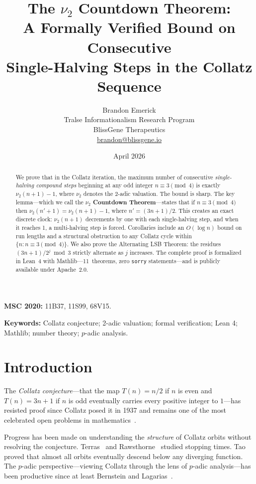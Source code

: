 \documentclass[12pt]{article}
\title{The $\nu_2$ Countdown Theorem:\\
A Formally Verified Bound on Consecutive\\
Single-Halving Steps in the Collatz Sequence}
\author{Brandon Emerick\\
\small Tralse Informationalism Research Program\\
\small BlissGene Therapeutics\\
\small \href{mailto:brandon@blissgene.io}{brandon@blissgene.io}}
\date{April 2026}
\newcommand{\vp}{\nu_2}
\begin{document}
\maketitle

\begin{abstract}
We prove that in the Collatz iteration, the maximum number of consecutive
\emph{single-halving compound steps} beginning at any odd integer
$n \equiv 3 \pmod{4}$ is exactly $\nu_2(n+1) - 1$, where $\nu_2$ denotes
the 2-adic valuation.  The bound is sharp.  The key lemma---which we call
the \textbf{$\nu_2$ Countdown Theorem}---states that if $n \equiv 3
\pmod{4}$ then $\nu_2(n'+1) = \nu_2(n+1) - 1$, where $n' = (3n+1)/2$.
This creates an exact discrete clock: $\vp(n+1)$ decrements by one with
each single-halving step, and when it reaches 1, a multi-halving step is
forced.  Corollaries include an $O(\log n)$ bound on run lengths and a
structural obstruction to any Collatz cycle within $\{n : n \equiv 3
\pmod 4\}$.  We also prove the Alternating LSB Theorem: the residues
$(3n+1)/2^j \bmod 3$ strictly alternate as $j$ increases.  The complete
proof is formalized in Lean~4 with Mathlib---11~theorems, zero
\lstinline{sorry} statements---and is publicly available under Apache~2.0.
\end{abstract}

\textbf{MSC 2020:} 11B37, 11S99, 68V15.

\textbf{Keywords:} Collatz conjecture; 2-adic valuation; formal
verification; Lean 4; Mathlib; number theory; $p$-adic analysis.

\section{Introduction}

The \emph{Collatz conjecture}---that the map
$T(n) = n/2$ if $n$ is even and $T(n) = 3n+1$ if $n$ is odd
eventually carries every positive integer to $1$---has resisted proof
since Collatz posed it in 1937 and remains one of the most celebrated
open problems in mathematics~\cite{Lagarias2010}.

Progress has been made on understanding the \emph{structure} of Collatz
orbits without resolving the conjecture.  Terras~\cite{Terras1976} and
Rawsthorne~\cite{Rawsthorne1985} studied stopping times.
Tao~\cite{Tao2022} proved that almost all orbits eventually descend below
any diverging function.  The $p$-adic perspective---viewing Collatz
through the lens of $p$-adic analysis---has been productive since at
least Bernstein and Lagarias~\cite{BernsteinLagarias1996}.
\end{document}
